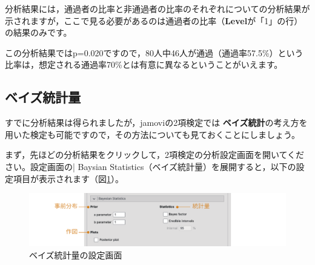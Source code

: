 \documentclass[
  12pt,
  a5jpaper,
  lualatex, ja=standard]{bxjsbook}
\renewcommand{\emph}[1]{\textbf{\color{emph} #1}}
\begin{document}
分析結果には，通過者の比率と非通過者の比率のそれぞれについての分析結果が示されますが，ここで見る必要があるのは通過者の比率（\textbf{Level}が「1」の行）の結果のみです。

この分析結果ではp=0.020ですので，80人中46人が通過（通過率57.5\%）という比率は，想定される通過率70\%とは有意に異なるということがいえます。

\hypertarget{sub:frequencies-binomial-bayes}{%
\subsection{ベイズ統計量}\label{sub:frequencies-binomial-bayes}}

すでに分析結果は得られましたが，jamoviの2項検定では\emph{ベイズ統計}の考え方を用いた検定も可能ですので，その方法についても見ておくことにしましょう。

まず，先ほどの分析結果をクリックして，2項検定の分析設定画面を開いてください。設定画面の\colorbox{bar}{\textcolor{gmoji2}{| Baysian Statistics}}（ベイズ統計量）を展開すると，以下の設定項目が表示されます（図\ref{fig:frequencies-binomial-bayes-setting}）。

\begin{figure}[!ht]

{\centering \includegraphics[width=1\linewidth]{images/frequencies/binomial-bayes-setting} 

}

\caption{ベイズ統計量の設定画面}\label{fig:frequencies-binomial-bayes-setting}
\end{figure}
\end{document}
